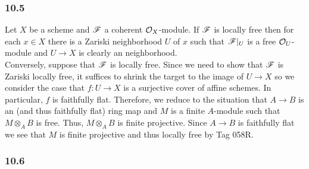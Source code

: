 \documentclass[12pt]{article}
\begin{document}
\subsubsection{10.5}

Let $X$ be a scheme and $\mathscr{F}$ a coherent $\mathcal{O}_{X}$-module. If $\mathscr{F}$ is locally free then for each $x \in X$ there is a Zariski neighborhood $U$ of $x$ such that $\mathscr{F}|_U$ is a free $\mathcal{O}_{U}$-module and $U \to X$ is clearly an \etale neighborhood. 
\bigskip\\
Conversely, suppose that $\mathscr{F}$ is \etale locally free. Since we need to show that $\mathscr{F}$ is Zariski locally free, it suffices to shrink the target to the image of $U \to X$ so we consider the case that $f : U \to X$ is a surjective \etale cover of affine schemes. In particular, $f$ is faithfully flat. Therefore, we reduce to the situation that $A \to B$ is an \etale (and thus faithfully flat) ring map and $M$ is a finite $A$-module such that $M \otimes_A B$ is free. Thus, $M \otimes_A B$ is finite projective. Since $A \to B$ is faithfully flat we see that $M$ is finite projective and thus locally free by Tag 058R.


\subsubsection{10.6}
\end{document}
